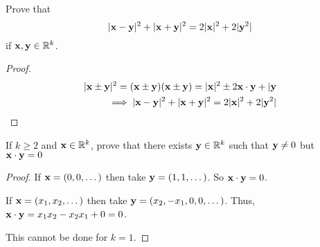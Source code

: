 \begin{prblm}
	Prove that $$ |{\bf x - y}|^2 + |{\bf x + y}|^2 = 2|{\bf x}|^2 + 2|{\bf y}^2|$$ 
	if ${\bf x, y} \in \mathbb{R}^k$.
	\begin{proof}
		\begin{align*}
			|{\bf x \pm y}|^2 = ({\bf x \pm y})({\bf x \pm y}) = |{\bf x}|^2 \pm 2{\bf x \cdot y} + |{\bf y} \\
			\implies |{\bf x - y}|^2 + |{\bf x + y}|^2 = 2|{\bf x}|^2 + 2|{\bf y}^2|
		\end{align*}
	\end{proof}
\end{prblm}

\begin{prblm}
	If $k \geq 2$ and ${\bf x} \in \mathbb{R}^k$, prove that there exists ${\bf y} \in \mathbb{R}^k$ such that 
	${\bf y} \neq 0$ but ${\bf x \cdot y} = 0$
	\begin{proof}
		If ${\bf x} = (0, 0, \dots)$ then take ${\bf y} = (1, 1, \dots)$. So ${\bf x \cdot y} = 0$.

		If ${\bf x} = (x_1, x_2, \dots)$ then take ${\bf y} = (x_2, -x_1, 0, 0, \dots)$.
		Thus, ${\bf x \cdot y} = x_1 x_2 - x_2 x_1 + 0 = 0$.
		
		This cannot be done for $k = 1$.
	\end{proof}
\end{prblm}
